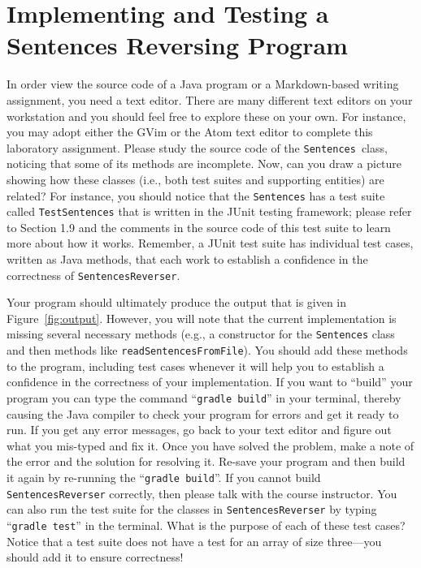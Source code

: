 \documentclass[11pt]{article}
\newcommand{\mainprogram}{\lstinline{SentencesReverser}}
\newcommand{\mainprogramhelper}{\lstinline{Sentences}}
\newcommand{\testprogram}{\lstinline{TestSentences}}
\newcommand{\gradlebuild}{\command{gradle build}}
\newcommand{\gradletest}{\command{gradle test}}
\newcommand{\command}[1]{``\lstinline{#1}''}
\newcommand{\program}[1]{\lstinline{#1}}
\newcommand{\step}[1]{``{#1}''}
\begin{document}
\section*{Implementing and Testing a Sentences Reversing Program}

In order view the source code of a Java program or a Markdown-based writing
assignment, you need a text editor. There are many different text editors on
your workstation and you should feel free to explore these on your own. For
instance, you may adopt either the GVim or the Atom text editor to complete
this laboratory assignment. Please study the source code of the
\mainprogramhelper~class, noticing that some of its methods are incomplete.
Now, can you draw a picture showing how these classes (i.e., both test suites
and supporting entities) are related? For instance, you should notice that the
\mainprogramhelper{} has a test suite called \testprogram{} that is written in
the JUnit testing framework; please refer to Section 1.9 and the comments in
the source code of this test suite to learn more about how it works. Remember,
a JUnit test suite has individual test cases, written as Java methods, that
each work to establish a confidence in the correctness of \mainprogram{}.

Your program should ultimately produce the output that is given in
Figure~\ref{fig:output}. However, you will note that the current implementation
is missing several necessary methods (e.g., a constructor for the
\program{Sentences} class and then methods like
\program{readSentencesFromFile}). You should add these methods to the program,
including test cases whenever it will help you to establish a confidence in the
correctness of your implementation. If you want to \step{build} your program you
can type the command \gradlebuild{} in your terminal, thereby causing the Java
compiler to check your program for errors and get it ready to run. If you get
any error messages, go back to your text editor and figure out what you
mis-typed and fix it. Once you have solved the problem, make a note of the error
and the solution for resolving it. Re-save your program and then build it again
by re-running the \gradlebuild{}. If you cannot build \mainprogram{} correctly,
then please talk with the course instructor. You can also run the test suite for
the classes in \mainprogram{} by typing \gradletest{} in the terminal. What is
the purpose of each of these test cases? Notice that a test suite does not have
a test for an array of size three---you should add it to ensure correctness!
\end{document}
